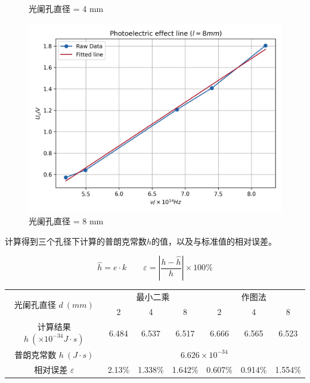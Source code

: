 \documentclass{ctexart}
\begin{document}
\begin{figure}[h!]
\begin{minipage}[b]{0.45\textwidth}
        \caption{光阑孔直径 = 4 mm}
    \end{minipage}
    \vfill
    \begin{minipage}[b]{0.45\textwidth}
        \centering
        \includegraphics[width=\textwidth]{l_8.png}
        \caption{光阑孔直径 = 8 mm}
    \end{minipage}
\end{figure}

计算得到三个孔径下计算的普朗克常数$h$的值，以及与标准值的相对误差。

$$ \hat{h} = e \cdot k \qquad \varepsilon = \left|\frac{h-\hat{h}}{h}\right|\times 100\% $$
\begin{table}[!h]
    \centering
    \renewcommand{\arraystretch}{1.5}
    \begin{tabular}{|c|c|c|c|c|c|c|}
        \hline
        \multirow{2}{*}{光阑孔直径 $d \ (mm)$} & \multicolumn{3}{c|}{最小二乘} & \multicolumn{3}{c|}{作图法} \\
        \cline{2-7}
         & 2 & 4 & 8 & 2 & 4 & 8 \\
        \hline
        计算结果 $\hat{h} \ (\times 10^{-34} J \cdot s)$ & 6.484 & 6.537 & 6.517 & 6.666 & 6.565 & 6.523 \\
        \hline
        普朗克常数 $h \ (J \cdot s)$ & \multicolumn{6}{c|}{$6.626 \times 10^{-34}$} \\
        \hline
        相对误差 $\varepsilon$ & 2.13\% & 1.338\% & 1.642\% & 0.607\% & 0.914\% & 1.554\% \\
        \hline
    \end{tabular}
\end{table}
\end{document}
